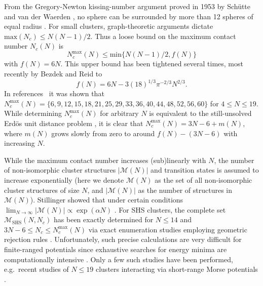 From the Gregory-Newton kissing-number argument proved in 1953 by Sch\"utte and
van der Waerden \autocite{Schutte_ProblemdreizehnKugeln_1952}, no sphere can be
surrounded by more than 12 spheres of equal radius \autocite{Conway_SpherePackingsLattices_1999}.  For
small clusters, graph-theoretic arguments dictate $\mathrm{max}(N_c)\le
N(N-1)/2$.  Thus a loose bound on the maximum contact number $N_c(N)$ is
%
\begin{equation}
    N_c^\mathrm{max}(N) \le \mathrm{min}\{N(N-1)/2,f(N)\}
    \label{eqn:upperlimitNc}
\end{equation}
%
with $f(N)=6N$.  This upper bound has been tightened several times, most
recently by Bezdek and Reid \autocite{Bezdek-2013} to
%
\begin{equation}
    f(N)=6N-3(18)^{1/3}\pi^{-2/3}N^{2/3}.
    \label{eqn:upperlimitBR}
\end{equation}
%
In
references~\cite{Hoy_Structuredynamicsmodel_2015,Holmes-Cerfon_EnumeratingRigidSphere_2016}
it was shown that $N_c^\mathrm{max}(N) =
\{6,9,12,15,18,21,25,29,33,36,40,44,48,52,56,60\}$ for $4 \leq N \leq 19$.
While determining $N_c^\mathrm{max}(N)$ for arbitrary $N$ is equivalent to the
still-unsolved Erd\"os unit distance problem \autocite{Erdos-1946}, it is clear
that $N_c^\mathrm{max}(N) = 3N - 6 + m(N)$, where $m(N)$ grows slowly from zero
to around $f(N) - (3N-6)$ with increasing $N$.

While the maximum contact number increases (sub)linearly with $N$, the number
of non-isomorphic cluster structures $|\mathcal{M}(N)|$ and transition states
is assumed to increase exponentially
\autocite{Stillinger_Exponentialmultiplicityinherent_1999,Oganov-2006,Forman_ModelingAggregationProcesses_2017}
(here we denote $\mathcal{M}(N)$ as the set of all non-isomorphic cluster
structures of size $N$, and $|\mathcal{M}(N)|$ as the number of structures in
$\mathcal{M}(N)$).  Stillinger showed that under certain conditions
$\lim_{N\to\infty} |\mathcal{M}(N)| \propto \exp(\alpha N)$
\autocite{Stillinger_Exponentialmultiplicityinherent_1999}.  For \ac{SHS}
clusters, the complete set $\mathcal{M}_\mathrm{SHS}(N,N_c)$ has been exactly
determined for $N \leq 14$ and $3N - 6 \leq N_c \leq N_c^\mathrm{max}(N)$ via
exact enumeration studies employing geometric rejection rules
\autocite{Hoy_Structuredynamicsmodel_2015,Holmes-Cerfon_EnumeratingRigidSphere_2016}.
Unfortunately, such precise calculations are very difficult for finite-ranged
potentials since exhaustive searches for energy minima are computationally
intensive \autocite{Heiles_Globaloptimizationclusters_2013}.  Only a few such
studies have been performed, e.g.\ recent studies of $N \leq 19$ clusters
interacting via short-range Morse potentials
\autocite{wales10,calvo12,C7CP03346J}.

